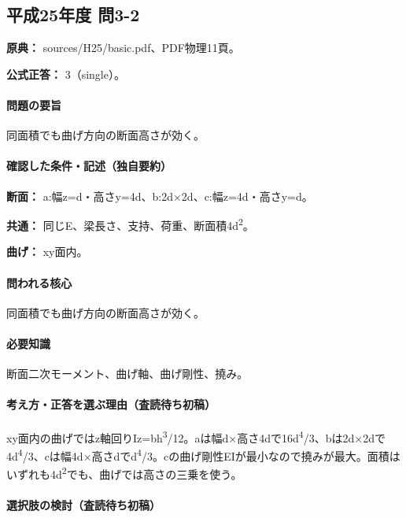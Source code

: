\subsection{平成25年度 問3-2}
\label{q:h25-reg-basic-3-2}

\noindent\textbf{原典：} sources/H25/basic.pdf、PDF物理11頁。

\textbf{公式正答：} 3（single）。

\paragraph{問題の要旨} 同面積でも曲げ方向の断面高さが効く。

\paragraph{確認した条件・記述（独自要約）}\mbox{}\par

\noindent\textbf{断面：} a:幅z=\allowbreak{}d・高さy=\allowbreak{}4d、b:2d×2d、c:幅z=\allowbreak{}4d・高さy=\allowbreak{}d。\par

\noindent\textbf{共通：} 同じE、梁長さ、支持、荷重、断面積4d\textsuperscript{2}。\par

\noindent\textbf{曲げ：} xy面内。\par

\paragraph{問われる核心} 同面積でも曲げ方向の断面高さが効く。

\paragraph{必要知識} 断面二次モーメント、曲げ軸、曲げ剛性、撓み。

\paragraph{考え方・正答を選ぶ理由（査読待ち初稿）} xy面内の曲げではz軸回りIz=\allowbreak{}bh\textsuperscript{3}/12。aは幅d×高さ4dで16d\textsuperscript{4}/3、bは2d×2dで4d\textsuperscript{4}/3、cは幅4d×高さdでd\textsuperscript{4}/3。cの曲げ剛性EIが最小なので撓みが最大。面積はいずれも4d\textsuperscript{2}でも、曲げでは高さの三乗を使う。

\paragraph{選択肢の検討（査読待ち初稿）}\mbox{}\par

